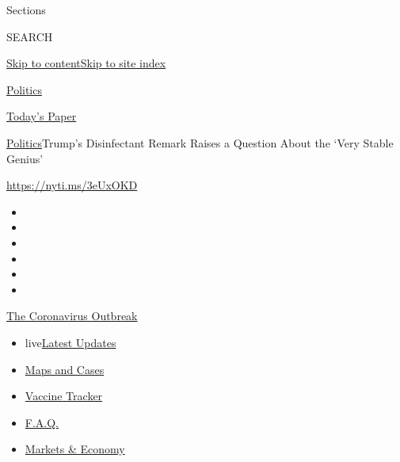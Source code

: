 Sections

SEARCH

\protect\hyperlink{site-content}{Skip to
content}\protect\hyperlink{site-index}{Skip to site index}

\href{https://www.nytimes.com/section/politics}{Politics}

\href{https://myaccount.nytimes.com/auth/login?response_type=cookie\&client_id=vi}{}

\href{https://www.nytimes.com/section/todayspaper}{Today's Paper}

\href{/section/politics}{Politics}\textbar{}Trump's Disinfectant Remark
Raises a Question About the `Very Stable Genius'

\href{https://nyti.ms/3eUxOKD}{https://nyti.ms/3eUxOKD}

\begin{itemize}
\item
\item
\item
\item
\item
\item
\end{itemize}

\href{https://www.nytimes.com/news-event/coronavirus?action=click\&pgtype=Article\&state=default\&region=TOP_BANNER\&context=storylines_menu}{The
Coronavirus Outbreak}

\begin{itemize}
\tightlist
\item
  live\href{https://www.nytimes.com/2020/08/08/world/coronavirus-updates.html?action=click\&pgtype=Article\&state=default\&region=TOP_BANNER\&context=storylines_menu}{Latest
  Updates}
\item
  \href{https://www.nytimes.com/interactive/2020/us/coronavirus-us-cases.html?action=click\&pgtype=Article\&state=default\&region=TOP_BANNER\&context=storylines_menu}{Maps
  and Cases}
\item
  \href{https://www.nytimes.com/interactive/2020/science/coronavirus-vaccine-tracker.html?action=click\&pgtype=Article\&state=default\&region=TOP_BANNER\&context=storylines_menu}{Vaccine
  Tracker}
\item
  \href{https://www.nytimes.com/interactive/2020/world/coronavirus-tips-advice.html?action=click\&pgtype=Article\&state=default\&region=TOP_BANNER\&context=storylines_menu}{F.A.Q.}
\item
  \href{https://www.nytimes.com/live/2020/08/07/business/stock-market-today-coronavirus?action=click\&pgtype=Article\&state=default\&region=TOP_BANNER\&context=storylines_menu}{Markets
  \& Economy}
\end{itemize}


